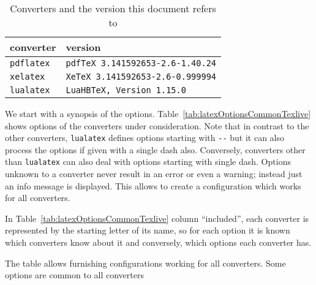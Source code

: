 \documentclass[a4paper]{article}%
\newcommand{\pdflatex}{\texttt{pdflatex}}
\newcommand{\lualatex}{\texttt{lualatex}}
\newcommand{\xelatex}{\texttt{xelatex}}
\begin{document}
\begin{longtable}{|ll|}
  \toprule
  converter & version \\
  \midrule
  \midrule
  \endfirsthead%
  \bottomrule
  \caption{\label{tab:versions} Converters and the version this document refers to }
  \endlastfoot%
  \pdflatex{}  & \texttt{pdfTeX 3.141592653-2.6-1.40.24} \\%
  \xelatex{}   & \texttt{XeTeX 3.141592653-2.6-0.999994} \\%
  \lualatex{}  & \texttt{LuaHBTeX, Version 1.15.0} \\
\end{longtable}


We start with a synopsis of the options. 
Table~\ref{tab:latexOptionsCommonTexlive} 
shows options of the converters under consideration. 
Note that in contrast to the other converters, 
\lualatex{} defines options starting with \texttt{-{}-} 
but it can also process the options if given with a single dash also. 
Conversely, converters other than \lualatex{} can also deal with options 
starting with single dash. 
Options unknown to a converter never result in an error or even a warning; 
instead just an info message is displayed. 
This allows to create a configuration which works for all converters. 

In Table~\ref{tab:latexOptionsCommonTexlive} column ``included'', 
each converter is represented by the starting letter of its name, 
so for each option it is known which converters know about it 
and conversely, which options each converter has. 

The table allows furnishing configurations working for all converters. 
Some options are common to all converters
\end{document}
